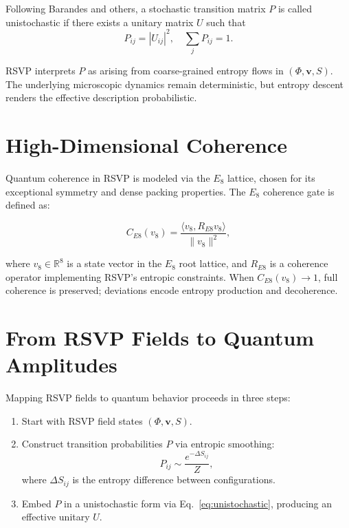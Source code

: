 \documentclass[12pt]{report}
\begin{document}
Following Barandes and others, a stochastic transition matrix $P$ is called unistochastic if there exists a unitary matrix $U$ such that
\begin{equation}
P_{ij} = |U_{ij}|^2, 
\quad \sum_j P_{ij} = 1.
\label{eq:unistochastic}
\end{equation}

RSVP interprets $P$ as arising from coarse-grained entropy flows in $(\Phi,\mathbf{v},S)$. The underlying microscopic dynamics remain deterministic, but entropy descent renders the effective description probabilistic.

\section{High-Dimensional Coherence}

Quantum coherence in RSVP is modeled via the $E_8$ lattice, chosen for its exceptional symmetry and dense packing properties. The $E_8$ coherence gate is defined as:

\begin{equation}
C_{E8}(v_8) = \frac{\langle v_8, R_{E8} v_8 \rangle}{\|v_8\|^2},
\label{eq:e8}
\end{equation}

where $v_8 \in \mathbb{R}^8$ is a state vector in the $E_8$ root lattice, and $R_{E8}$ is a coherence operator implementing RSVP’s entropic constraints.  
When $C_{E8}(v_8) \to 1$, full coherence is preserved; deviations encode entropy production and decoherence.

\section{From RSVP Fields to Quantum Amplitudes}

Mapping RSVP fields to quantum behavior proceeds in three steps:

\begin{enumerate}
    \item Start with RSVP field states $(\Phi,\mathbf{v},S)$.  
    \item Construct transition probabilities $P$ via entropic smoothing:  
    \[
    P_{ij} \sim \frac{e^{-\Delta S_{ij}}}{Z},
    \]
    where $\Delta S_{ij}$ is the entropy difference between configurations.  
    \item Embed $P$ in a unistochastic form via Eq.~\eqref{eq:unistochastic}, producing an effective unitary $U$.
\end{enumerate}
\end{document}
